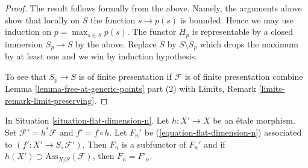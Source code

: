 \begin{proof}
\medskip\noindent
The result follows formally from the above.
Namely, the arguments above show that locally on $S$ the function
$s \mapsto p(s)$ is bounded. Hence we may use induction
on $p = \max_{s \in S} p(s)$. The functor $H_p$ is representable
by a closed immersion $S_p \to S$ by the above. Replace $S$ by
$S \setminus S_p$ which drops the maximum by at least one and
we win by induction hypothesis.

\medskip\noindent
To see that $S_p \to S$ is of finite presentation if $\mathcal{F}$
is of finite presentation combine
Lemma \ref{lemma-free-at-generic-points} part (2)
with
Limits, Remark \ref{limits-remark-limit-preserving}.
\end{proof}

\begin{lemma}
\label{lemma-localize-flat-dimension-n}
In Situation \ref{situation-flat-dimension-n}.
Let $h : X' \to X$ be an \'etale morphism.
Set $\mathcal{F}' = h^*\mathcal{F}$ and $f' = f \circ h$.
Let $F_n'$ be (\ref{equation-flat-dimension-n})
associated to $(f' : X' \to S, \mathcal{F}')$.
Then $F_n$ is a subfunctor of $F_n'$ and if
$h(X') \supset \text{Ass}_{X/S}(\mathcal{F})$, then $F_n = F'_n$.
\end{lemma}

